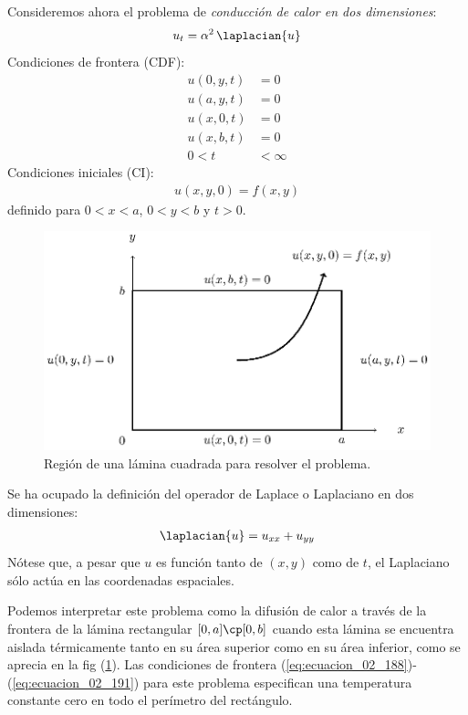 Consideremos ahora el problema de \emph{conducción de calor en dos dimensiones}:
\begin{align}
u_{t} = \alpha^{2} \, \laplacian{u}
\label{eq:ecuacion_02_187}
\end{align}
Condiciones de frontera (CDF):
\begin{align}
u(0, y, t) &= 0 \label{eq:ecuacion_02_188} \\
u(a, y, t) &= 0 \label{eq:ecuacion_02_189} \\
u(x, 0, t) &= 0 \label{eq:ecuacion_02_190} \\
u(x, b, t) &= 0 \label{eq:ecuacion_02_191} \\
0 < t &< \infty \nonumber
\end{align}
Condiciones iniciales (CI):
\begin{align}
u(x, y, 0) = f (x, y) \label{eq:ecuacion_02_192}
\end{align}
definido para $0 < x < a$, $0  < y < b$ y $t > 0$.
\begin{figure}[H]
    \centering
    \includegraphics[scale=1.3]{Imagenes/Separacion_Variables_01_Lamina_Cuad.eps}
    \caption{Región de una lámina cuadrada para resolver el problema.}
    \label{fig:figura_lamina_cuadrada}
\end{figure}
Se ha ocupado la definición del operador de Laplace o Laplaciano en dos dimensiones:
\begin{align}
\laplacian{u} = u_{xx} + u_{yy}
\label{eq:ecuacion_02_193}
\end{align}
Nótese que, a pesar que $u$ es función tanto de $(x, y) $ como de $t$, el Laplaciano sólo actúa en las coordenadas espaciales.
\par
Podemos interpretar este problema como la difusión de calor a través de la frontera de la lámina rectangular $[ 0, a ] \cp [ 0, b ]$ cuando esta lámina se encuentra aislada térmicamente tanto en su área superior como en su área inferior, como se aprecia en la fig (\ref{fig:figura_lamina_cuadrada}). Las condiciones de frontera (\ref{eq:ecuacion_02_188})-(\ref{eq:ecuacion_02_191}) para este problema especifican una temperatura constante cero en todo el perímetro del rectángulo.
